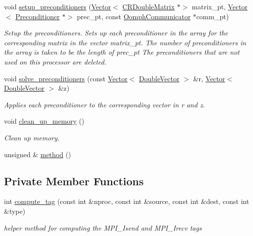 \begin{DoxyCompactItemize}
void \hyperlink{classoomph_1_1PreconditionerArray_ac575b5a9fe045dcba7e42aa0c445a7ee}{setup\+\_\+preconditioners} (\hyperlink{classoomph_1_1Vector}{Vector}$<$ \hyperlink{classoomph_1_1CRDoubleMatrix}{C\+R\+Double\+Matrix} $\ast$$>$ matrix\+\_\+pt, \hyperlink{classoomph_1_1Vector}{Vector}$<$ \hyperlink{classoomph_1_1Preconditioner}{Preconditioner} $\ast$$>$ prec\+\_\+pt, const \hyperlink{classoomph_1_1OomphCommunicator}{Oomph\+Communicator} $\ast$comm\+\_\+pt)
\begin{DoxyCompactList}\small\item\em Setup the preconditioners. Sets up each preconditioner in the array for the corresponding matrix in the vector matrix\+\_\+pt. The number of preconditioners in the array is taken to be the length of prec\+\_\+pt The preconditioners that are not used on this processor are deleted. \end{DoxyCompactList}\item 
void \hyperlink{classoomph_1_1PreconditionerArray_a11a8bc01a8addffd5212369a2dc72ef7}{solve\+\_\+preconditioners} (const \hyperlink{classoomph_1_1Vector}{Vector}$<$ \hyperlink{classoomph_1_1DoubleVector}{Double\+Vector} $>$ \&r, \hyperlink{classoomph_1_1Vector}{Vector}$<$ \hyperlink{classoomph_1_1DoubleVector}{Double\+Vector} $>$ \&z)
\begin{DoxyCompactList}\small\item\em Applies each preconditioner to the corresponding vector in r and z. \end{DoxyCompactList}\item 
void \hyperlink{classoomph_1_1PreconditionerArray_aa215f08a32f670700a08035bcc75dc63}{clean\+\_\+up\+\_\+memory} ()
\begin{DoxyCompactList}\small\item\em Clean up memory. \end{DoxyCompactList}\item 
unsigned \& \hyperlink{classoomph_1_1PreconditionerArray_a73db1b394930346aa2d8d2902cca12e6}{method} ()
\end{DoxyCompactItemize}
\subsection*{Private Member Functions}
\begin{DoxyCompactItemize}
\item 
int \hyperlink{classoomph_1_1PreconditionerArray_a6a265f95d2cbb2fe10b9d08595fe7faf}{compute\+\_\+tag} (const int \&nproc, const int \&source, const int \&dest, const int \&type)
\begin{DoxyCompactList}\small\item\em helper method for computing the M\+P\+I\+\_\+\+Isend and M\+P\+I\+\_\+\+Irecv tags \end{DoxyCompactList}\end{DoxyCompactItemize}
